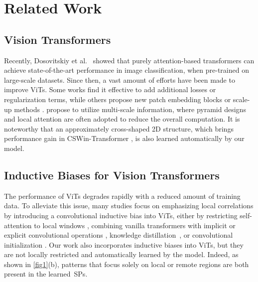 \documentclass[authorversion, sigconf, acmthm=false, nonacm=true]{acmart}
\begin{document}
\section{Related Work}
\label{sec:related}


\subsection{Vision Transformers}

Recently, Dosovitskiy et al.~\cite{dosovitskiy2021an} showed that purely attention-based transformers can achieve state-of-the-art performance in image classification, when pre-trained on large-scale datasets. 
Since then, a vast amount of efforts have been made to improve ViTs. 
Some works \cite{jiang2021all, gong2021improve} find it effective to add additional losses or regularization terms, 
while others propose new patch embedding blocks \cite{han2021transformer} or scale-up methods \cite{touvron2021going, zhou2021deepvit}. 
\cite{liu2021swin, dong2021cswin, zhang2021aggregating, wang2021pyramid} propose to utilize multi-scale information, where pyramid designs and local attention are often adopted to reduce the overall computation.   
It is noteworthy that an approximately cross-shaped 2D structure, which brings performance gain in CSWin-Transformer \cite{dong2021cswin}, is also learned automatically by our model. 


\subsection{Inductive Biases for Vision Transformers}
The performance of ViTs degrades rapidly with a reduced amount of training data.
To alleviate this issue, many studies focus on emphasizing local correlations by introducing a convolutional inductive bias into ViTs,
either by restricting self-attention to local windows \cite{liu2021swin, dong2021cswin}, 
combining vanilla transformers with implicit or explicit convolutional operations 
\cite{yuan2021incorporating, dai2021coatnet, yuan2021tokens, wu2021cvt, graham2021levit}, knowledge distillation~\cite{touvron2021training}, or convolutional initialization \cite{d'ascoli2021convit}.
Our work also incorporates inductive biases into ViTs, but they are not locally restricted and automatically learned by the model. 
Indeed, as shown in \cref{fig1}(b), patterns that focus solely on local or remote regions are both present in the learned~SPs. 
\end{document}
